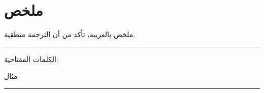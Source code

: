 \chapter*{\hfill\arabictitlefont\beginR ملخص\endR}

\begin{flushright}
\arabicfont\beginR ملخص بالعربية، تأكد من أن الترجمة منطقية.\endR
\end{flushright}

\noindent\rule[2pt]{\textwidth}{0.5pt}

\begin{flushright}
\arabicfont\beginR الكلمات المفتاحية:\endR

\arabicfont\beginR مثال\endR
\end{flushright}

\noindent\rule[2pt]{\textwidth}{0.5pt}
